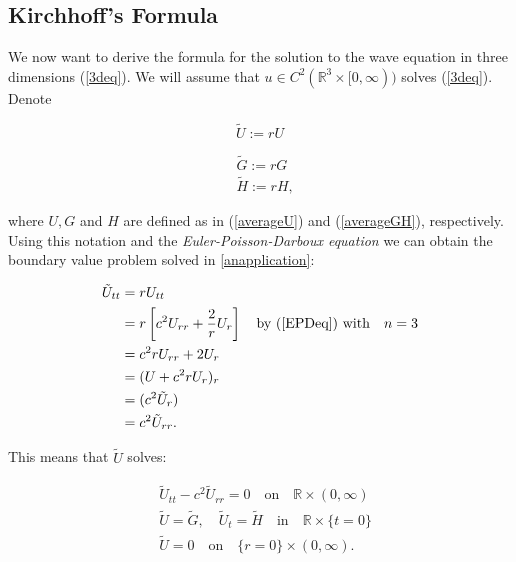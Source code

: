\documentclass[12pt]{article}
\numberwithin{equation}{section}
\begin{document}
\subsection{Kirchhoff's Formula}
We now want to derive the formula for the solution to the wave equation in three dimensions (\ref{3deq}). We will assume that $u \in C^2(\mathbb{R}^3 \times
[0, \infty))$ solves (\ref{3deq}). Denote 

\begin{equation} \label{Udash}
    \tilde{U}:=rU
\end{equation}

\begin{equation} \label{GHdash}
    \begin{aligned}
        &\tilde{G}:=rG\\
        &\tilde{H}:=rH,    
    \end{aligned}
\end{equation}

where $U,G$ and $H$ are defined as in (\ref{averageU}) and (\ref{averageGH}), respectively. Using this notation and the \emph{Euler-Poisson-Darboux equation} we can
obtain the boundary value problem solved in \ref{anapplication}:

\begin{equation*}
    \begin{aligned}
        \tilde{U}_{tt}&=rU_{tt}\\
        &=r\left[c^2U_{rr}+\frac{2}{r}U_r\right] \quad \textrm{by (\ref{EPDeq}) with} \quad n=3\\
        &=c^2rU_{rr}+2U_r\\
        &=(U+c^2rU_r)_r\\
        &=(c^2\tilde{U}_r)\\
        &=c^2\tilde{U}_{rr}.        
    \end{aligned}
\end{equation*}

This means that $\tilde{U}$ solves:

\begin{equation} \label{tilUwave}
    \begin{aligned}
        &\tilde{U}_{tt}-c^2\tilde{U}_{rr}=0 \quad \textrm{on} \quad \mathbb{R}\times (0,\infty)\\
        &\tilde{U}=\tilde{G}, \quad \tilde{U}_t=\tilde{H} \quad \textrm{in} \quad \mathbb{R}\times\{t=0\}\\
        &\tilde{U}=0 \quad \textrm{on} \quad \{r=0\}\times (0, \infty).
    \end{aligned}
\end{equation}
\end{document}
